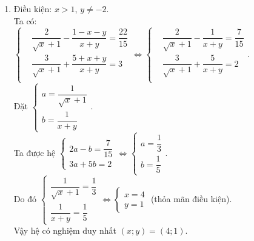 \begin{bt}
{\begin{enumerate}
			Vậy hệ có nghiệm duy nhất $\left(x;y\right) = \left(2; -\dfrac{5}{2}\right)$.
			\item 
			Điều kiện: $x > 1$, $y \ne -2$.\\
			Ta có:\\
			$\left\{ \begin{aligned}
			& \dfrac{2}{\sqrt{x}+1}-\dfrac{1-x-y}{x+y}=\dfrac{22}{15} \\ 
			& \dfrac{3}{\sqrt{x}+1}+\dfrac{5+x+y}{x+y}=3 \\ 
			\end{aligned} \right. \Leftrightarrow \left\{ \begin{aligned}
			& \dfrac{2}{\sqrt{x}+1}-\dfrac{1}{x+y}=\dfrac{7}{15} \\ 
			& \dfrac{3}{\sqrt{x}+1}+\dfrac{5}{x+y}=2 \\ 
			\end{aligned} \right.$. \\
			Đặt $\begin{cases} a = \dfrac{1}{\sqrt{x}+1}\\ b = \dfrac{1}{x+y}\end{cases}$.\\ 
			Ta được hệ $\begin{cases} 2a - b = \dfrac{7}{15}\\ 3a  + 5b = 2\end{cases} \Leftrightarrow \begin{cases} a = \dfrac{1}{3}\\ b = \dfrac{1}{5} \end{cases}$. \\
			Do đó $\begin{cases} \dfrac{1}{\sqrt{x}+1} =\dfrac{1}{3}\\ \dfrac{1}{x+y} =  \dfrac{1}{5} \end{cases} \Leftrightarrow \begin{cases} x=4\\ y = 1 \end{cases}$ (thỏa mãn điều kiện).\\
			Vậy hệ có nghiệm duy nhất $\left(x;y\right) = \left(4; 1 \right)$.
			

\end{enumerate}}
\end{bt}
